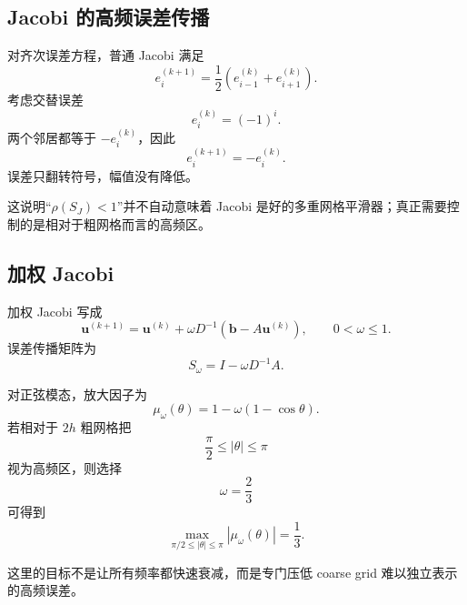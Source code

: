 \subsection{Jacobi 的高频误差传播}

对齐次误差方程，普通 Jacobi 满足
\begin{equation}
e_i^{(k+1)}
=
\frac12
\left(
e_{i-1}^{(k)}
+
e_{i+1}^{(k)}
\right).
\end{equation}
考虑交替误差
\begin{equation}
e_i^{(k)}=(-1)^i.
\end{equation}
两个邻居都等于 $-e_i^{(k)}$，因此
\begin{equation}
e_i^{(k+1)}
=
-e_i^{(k)}.
\end{equation}
误差只翻转符号，幅值没有降低。

这说明“$\rho(S_J)<1$”并不自动意味着 Jacobi 是好的多重网格平滑器；真正需要控制的是相对于粗网格而言的高频区。

\subsection{加权 Jacobi}

加权 Jacobi 写成
\begin{equation}
\bm u^{(k+1)}
=
\bm u^{(k)}
+
\omega D^{-1}
\left(
\bm b-A\bm u^{(k)}
\right),
\qquad
0<\omega\le1.
\label{eq:smoothing-weighted-jacobi}
\end{equation}
误差传播矩阵为
\begin{equation}
S_\omega
=
I-\omega D^{-1}A.
\end{equation}

对正弦模态，放大因子为
\begin{equation}
\mu_\omega(\theta)
=
1-\omega(1-\cos\theta).
\label{eq:smoothing-weighted-factor}
\end{equation}
若相对于 $2h$ 粗网格把
\begin{equation}
\frac{\pi}{2}\le|\theta|\le\pi
\end{equation}
视为高频区，则选择
\begin{equation}
\omega=\frac23
\end{equation}
可得到
\begin{equation}
\boxed{
\max_{\pi/2\le|\theta|\le\pi}
|\mu_\omega(\theta)|
=
\frac13.
}
\label{eq:smoothing-weighted-high-frequency}
\end{equation}

这里的目标不是让所有频率都快速衰减，而是专门压低 coarse grid 难以独立表示的高频误差。

